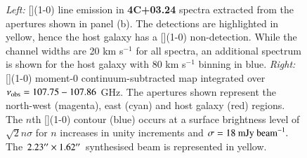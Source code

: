 \begin{figure}
\hspace*{-50pt}
\centering
\caption[{4C+03.24 [](1-0) line spectra and moment-0 maps}]{{\it Left:} [](1-0) line emission in {\bf 4C+03.24} spectra extracted from the apertures shown in panel (b). The detections are highlighted in yellow, hence the host galaxy has a [](1-0) non-detection. While the channel widths are 20 km s$^{-1}$ for all spectra, an additional spectrum is shown for the host galaxy with 80 km s$^{-1}$ binning in blue. {\it Right:} [](1-0) moment-0 continuum-subtracted map integrated over $\nu_{\rm obs}=107.75 - 107.86$ GHz. The apertures shown represent the north-west (magenta), east (cyan) and host galaxy (red) regions. The $n$th [](1-0) contour (blue) occurs at a surface brightness level of $\sqrt{2}{n}\sigma$ for $n$ increases in unity increments and $\sigma = 18~\rm{mJy~beam}^{-1}.$ The $2.23^{\prime\prime} \times 1.62^{\prime\prime}$ synthesised beam is represented in yellow. }
\label{fig:4C03-fit-CI-moment0}
\end{figure}

